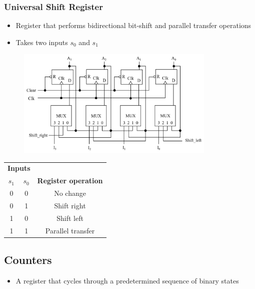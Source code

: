 \documentclass[a4paper]{article}
\begin{document}
\subsubsection{Universal Shift Register}
\begin{itemize}
    \item Register that performs bidirectional bit-shift and parallel transfer operations
    \item Takes two inputs $s_0$ and $s_1$
\end{itemize}
\begin{figure}[H]
    \centering
    \includegraphics[width=0.85\textwidth]{uni_shift_reg.png}
\end{figure}
\begin{table}[H]
\centering
\begin{tabular}{ccc}
\multicolumn{2}{c}{\textbf{Inputs}} &  \\
$s_1$ & $s_0$ & \textbf{Register operation} \\
\hline
0 & 0 & No change \\
0 & 1 & Shift right \\
1 & 0 & Shift left \\
1 & 1 & Parallel transfer
\end{tabular}
\end{table}

\newpage
\subsection{Counters}
\begin{itemize}
    \item A register that cycles through a predetermined sequence of binary states 
\end{itemize}
\end{document}
